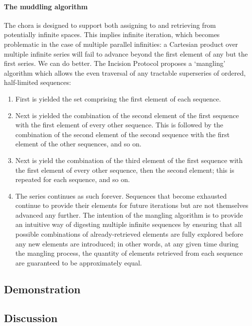 \documentclass[a4paper,11pt,oneside]{book}
\begin{document}
\paragraph{The muddling algorithm}

The chora is designed to support both assigning to and retrieving from potentially infinite spaces. This implies infinite iteration, which becomes problematic in the case of multiple parallel infinities: a Cartesian product over multiple infinite series will fail to advance beyond the first element of any but the first series. We can do better. The Incision Protocol proposes a `mangling' algorithm which allows the even traversal of any tractable superseries of ordered, half-limited sequences:

\begin{enumerate}
\item First is yielded the set comprising the first element of each sequence.
\item Next is yielded the combination of the second element of the first sequence with the first element of every other sequence. This is followed by the combination of the second element of the second sequence with the first element of the other sequences, and so on.
\item Next is yield the combination of the third element of the first sequence with the first element of every other sequence, then the second element; this is repeated for each sequence, and so on.
\item The series continues as such forever. Sequences that become exhausted continue to provide their elements for future iterations but are not themselves advanced any further.
The intention of the mangling algorithm is to provide an intuitive way of digesting multiple infinite sequences by ensuring that all possible combinations of already-retrieved elements are fully explored before any new elements are introduced; in other words, at any given time during the mangling process, the quantity of elements retrieved from each sequence are guaranteed to be approximately equal.
\end{enumerate}

\subsection{Demonstration}

\subsection{Discussion}
\end{document}
